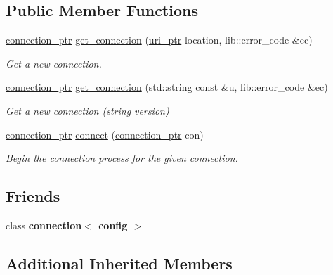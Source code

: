 \subsection*{Public Member Functions}
\begin{DoxyCompactItemize}
\item 
\mbox{\hyperlink{classwebsocketpp_1_1client_a2e187bbb2beac676bbfbc2e8065de83e}{connection\+\_\+ptr}} \mbox{\hyperlink{classwebsocketpp_1_1client_aa95cec974921e32bc37a61c683ae240d}{get\+\_\+connection}} (\mbox{\hyperlink{namespacewebsocketpp_aae370ea5ac83a8ece7712cb39fc23f5b}{uri\+\_\+ptr}} location, lib\+::error\+\_\+code \&ec)
\begin{DoxyCompactList}\small\item\em Get a new connection. \end{DoxyCompactList}\item 
\mbox{\hyperlink{classwebsocketpp_1_1client_a2e187bbb2beac676bbfbc2e8065de83e}{connection\+\_\+ptr}} \mbox{\hyperlink{classwebsocketpp_1_1client_a1197f043c8c6c03398e4f07be4bdf135}{get\+\_\+connection}} (std\+::string const \&u, lib\+::error\+\_\+code \&ec)
\begin{DoxyCompactList}\small\item\em Get a new connection (string version) \end{DoxyCompactList}\item 
\mbox{\hyperlink{classwebsocketpp_1_1client_a2e187bbb2beac676bbfbc2e8065de83e}{connection\+\_\+ptr}} \mbox{\hyperlink{classwebsocketpp_1_1client_a818c30343180123bf1fee6dc21524bae}{connect}} (\mbox{\hyperlink{classwebsocketpp_1_1client_a2e187bbb2beac676bbfbc2e8065de83e}{connection\+\_\+ptr}} con)
\begin{DoxyCompactList}\small\item\em Begin the connection process for the given connection. \end{DoxyCompactList}\end{DoxyCompactItemize}
\subsection*{Friends}
\begin{DoxyCompactItemize}
\item 
\mbox{\label{classwebsocketpp_1_1client_a408f6796a357de56c73c3beb2f13c61d}} 
class {\bfseries connection$<$ config $>$}
\end{DoxyCompactItemize}
\subsection*{Additional Inherited Members}


